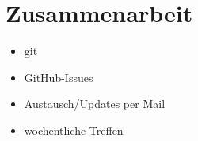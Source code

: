 \section{Zusammenarbeit}
	\begin{itemize}
		\item git
		\item GitHub-Issues
		\item Austausch/Updates per Mail
		\item wöchentliche Treffen
	\end{itemize}